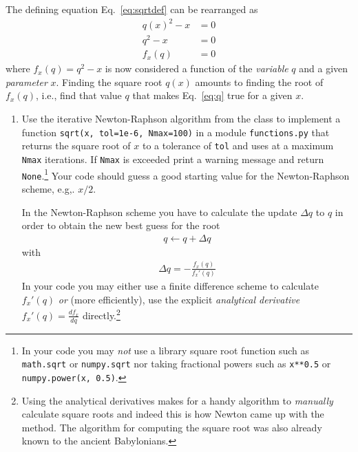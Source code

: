 \documentclass[letterpaper]{scrartcl}
\newenvironment{enuma}{\begin{enumerate}[label=(\alph*)]}{\end{enumerate}}
\begin{document}
The defining equation Eq.~\ref{eq:sqrtdef} can be rearranged as 
\begin{align}
  q(x)^{2} - x &= 0   \label{eq:sqrtroot}\\
  q^{2} - x &= 0 \label{eq:q}\\
  f_{x}(q) &= 0 \label{eq:fqx}
\end{align}
where $f_{x}(q) = q^{2} - x$ is now considered a function of the
\emph{variable} $q$ and a given \emph{parameter} $x$. Finding the
square root $q(x)$ amounts to finding the root of $f_{x}(q)$, i.e.,
find that value $q$ that makes Eq.~\ref{eq:q} true for a given $x$.

\begin{enuma}
\item \label{li:NR} Use the iterative Newton-Raphson algorithm from the class to
  implement a function \texttt{sqrt(x, tol=1e-6, Nmax=100)} in a
  module \texttt{functions.py} that returns the square root of $x$ to
  a tolerance of \texttt{tol} and uses at a maximum \texttt{Nmax}
  iterations. If \texttt{Nmax} is exceeded print a warning message and
  return \texttt{None}.\footnote{In your code you may \emph{not} use a
    library square root function such as \texttt{math.sqrt} or
    \texttt{numpy.sqrt} nor taking fractional powers such as
    \texttt{x**0.5} or \texttt{numpy.power(x, 0.5)}.} Your code should
  guess a good starting value for the Newton-Raphson scheme,
  e.g,. $x/2$. 

  In the Newton-Raphson scheme you have to calculate the update
  $\Delta q$ to $q$ in order to obtain the new best guess for the root
  \begin{gather}
    \label{eq:update}
    q \leftarrow q + \Delta q
  \end{gather}
  with
  \begin{gather}
    \label{eq:NR}
    \Delta q = -\frac{f_{x}(q)}{f_{x}'(q)}
  \end{gather}
  In your code you may either use a finite difference scheme to
  calculate $f_{x}'(q)$ \emph{or} (more efficiently), use the explicit
  \emph{analytical derivative} $f_{x}'(q) = \frac{df_{x}}{dq}$
  directly.\footnote{Using the analytical derivatives makes for a
    handy algorithm to \emph{manually} calculate square roots and
    indeed this is how Newton came up with the method. The algorithm
    for computing the square root was also already known to the
    ancient Babylonians.}


\end{enuma}
\end{document}
